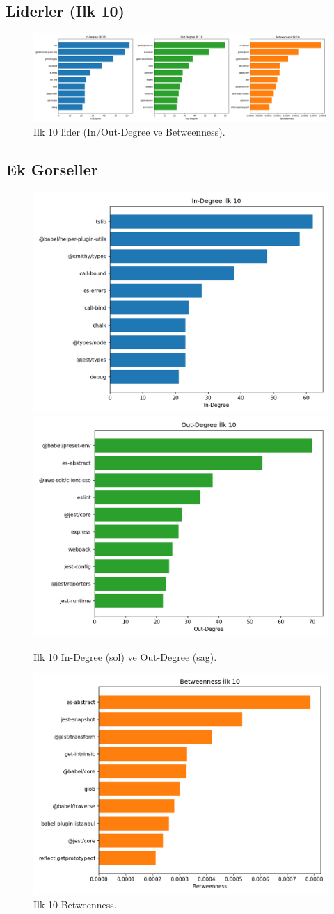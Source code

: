 \documentclass[11pt,a4paper]{article}
\begin{document}
\subsection{Liderler (Ilk 10)}
\begin{figure}[h]
  \centering
  \includegraphics[width=0.90\linewidth]{top10_leaders.png}
  \caption{Ilk 10 lider (In/Out-Degree ve Betweenness).}
\end{figure}

\subsection{Ek Gorseller}
\begin{figure}[h]
  \centering
  \includegraphics[width=0.48\linewidth]{top10_in_degree.png}
  \includegraphics[width=0.48\linewidth]{top10_out_degree.png}
  \caption{Ilk 10 In-Degree (sol) ve Out-Degree (sag).}
\end{figure}

\begin{figure}[h]
  \centering
  \includegraphics[width=0.6\linewidth]{top10_betweenness.png}
  \caption{Ilk 10 Betweenness.}
\end{figure}
\end{document}
